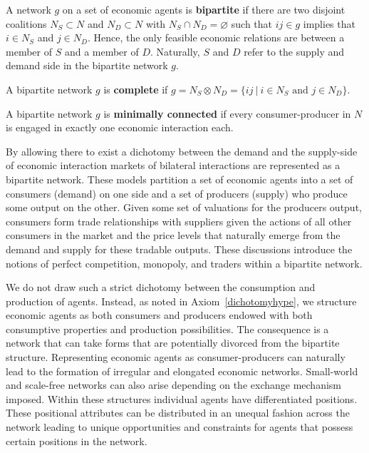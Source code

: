 \begin{definition} \label{def:bipartiteNetworks}
A network $g$ on a set of economic agents is \textbf{bipartite} if there are two disjoint coalitions $N_{S} \subset N$ and $N_{D} \subset N$ with $N_{S} \cap N_{D} = \varnothing$ such that $ij \in g$ implies that $i \in N_{S}$ and $j \in N_{D}$. Hence, the only feasible economic relations are between a member of $S$ and a member of $D$. Naturally, $S$ and $D$ refer to the supply and demand side in the bipartite network $g$.

\noindent A bipartite network $g$ is \textbf{complete} if $g = N_{S} \otimes N_{D} = \{ ij ~ | ~ i \in N_{S} \mbox{ and } j \in N_{D} \}$.

\noindent A bipartite network $g$ is \textbf{minimally connected} if every consumer-producer in $N$ is engaged in exactly one economic interaction each.
\end{definition}
By allowing there to exist a dichotomy between the demand and the supply-side of economic interaction markets of bilateral interactions are represented as a bipartite network. These models partition a set of economic agents into a set of consumers (demand) on one side and a set of producers (supply) who produce some output on the other. Given some set of valuations for the producers output, consumers form trade relationships with suppliers given the actions of all other consumers in the market and the price levels that naturally emerge from the demand and supply for these tradable outputs. These discussions introduce the notions of perfect competition, monopoly, and traders within a bipartite network.

We do not draw such a strict dichotomy between the consumption and production of agents. Instead, as noted in Axiom~\ref{dichotomyhype}, we structure economic agents as both consumers and producers endowed with both consumptive properties and production possibilities. The consequence is a network that can take forms that are potentially divorced from the bipartite structure. Representing economic agents as consumer-producers can naturally lead to the formation of irregular and elongated economic networks. Small-world and scale-free networks can also arise depending on the exchange mechanism imposed. Within these structures individual agents have differentiated positions. These positional attributes can be distributed in an unequal fashion across the network leading to unique opportunities and constraints for agents that possess certain positions in the network.


